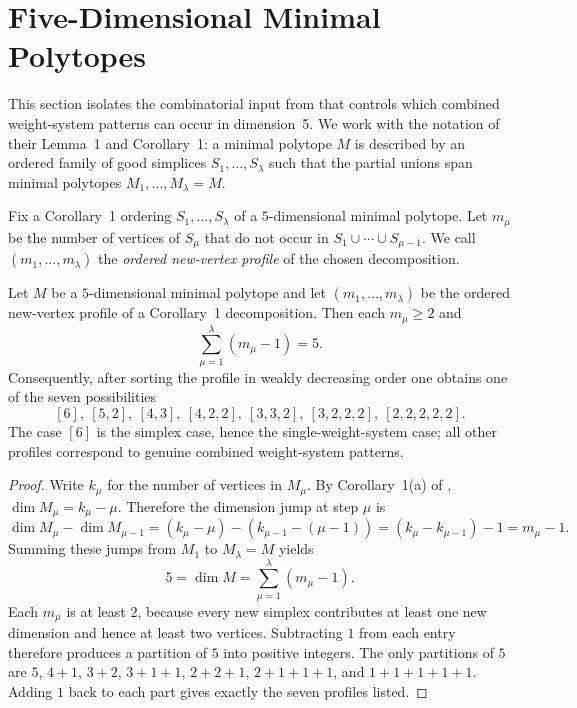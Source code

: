 \section{Five-Dimensional Minimal Polytopes}
\label{sec:minimal-5d}

This section isolates the combinatorial input from
\citet{KreuzerSkarke1997} that controls which combined weight-system
patterns can occur in dimension~5.  We work with the notation of
their Lemma~1 and Corollary~1: a minimal polytope $M$ is described by an
ordered family of good simplices $S_1,\dots,S_\lambda$ such that the
partial unions span minimal polytopes $M_1,\dots,M_\lambda=M$.

\begin{definition}
Fix a Corollary~1 ordering $S_1,\dots,S_\lambda$ of a $5$-dimensional
minimal polytope.  Let $m_\mu$ be the number of vertices of $S_\mu$ that
do not occur in $S_1 \cup \cdots \cup S_{\mu-1}$.  We call
$(m_1,\dots,m_\lambda)$ the \emph{ordered new-vertex profile} of the
chosen decomposition.
\end{definition}

\begin{proposition}
\label{prop:5d-profiles}
Let $M$ be a $5$-dimensional minimal polytope and let
$(m_1,\dots,m_\lambda)$ be the ordered new-vertex profile of a Corollary~1
decomposition.  Then each $m_\mu \ge 2$ and
\[
  \sum_{\mu=1}^{\lambda} (m_\mu - 1) = 5.
\]
Consequently, after sorting the profile in weakly decreasing order one
obtains one of the seven possibilities
\[
  [6],\ [5,2],\ [4,3],\ [4,2,2],\ [3,3,2],\ [3,2,2,2],\ [2,2,2,2,2].
\]
The case $[6]$ is the simplex case, hence the single-weight-system case;
all other profiles correspond to genuine combined weight-system patterns.
\end{proposition}

\begin{proof}
Write $k_\mu$ for the number of vertices in $M_\mu$.  By
Corollary~1(a) of \citet{KreuzerSkarke1997},
$\dim M_\mu = k_\mu - \mu$.  Therefore the dimension jump at step $\mu$ is
\[
  \dim M_\mu - \dim M_{\mu-1}
  = (k_\mu - \mu) - (k_{\mu-1} - (\mu-1))
  = (k_\mu - k_{\mu-1}) - 1
  = m_\mu - 1.
\]
Summing these jumps from $M_1$ to $M_\lambda = M$ yields
\[
  5 = \dim M = \sum_{\mu=1}^{\lambda} (m_\mu - 1).
\]
Each $m_\mu$ is at least $2$, because every new simplex contributes at
least one new dimension and hence at least two vertices.  Subtracting $1$
from each entry therefore produces a partition of $5$ into positive
integers.  The only partitions of $5$ are
$5$, $4+1$, $3+2$, $3+1+1$, $2+2+1$, $2+1+1+1$, and $1+1+1+1+1$.
Adding $1$ back to each part gives exactly the seven profiles listed.
\end{proof}

